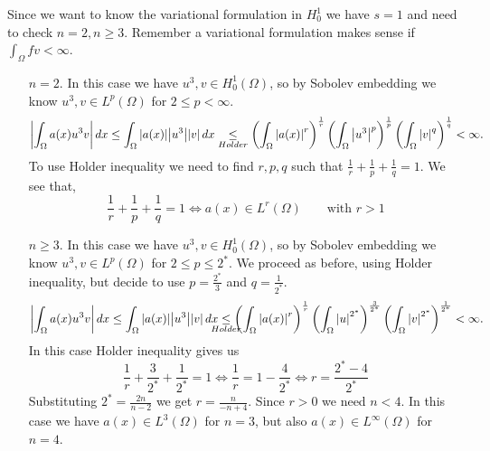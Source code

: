 Since we want to know the variational formulation in \(H^1_0\) we have \(s = 1\) and need to check \(n = 2, n \geq 3\). Remember a variational formulation makes sense if \(\int_\Omega fv < \infty\).
\begin{itemize}
    \item[\(n = 2\).] In this case we have \(u^3, v \in H^1_0(\Omega)\), so by Sobolev embedding we know \(u^3, v \in L^p(\Omega)\) for \(2 \leq p < \infty\). 
    \[
        \abs{\int_\Omega a(x) u^3 v}  \, dx \leq \int_\Omega \abs{a(x)} \abs{u^3} \abs{v} \, dx \underset{Holder}{\leq} \left(\int_\Omega \abs{a(x)}^r\right)^{\frac{1}{r}} \left(\int_\Omega \abs{u^3}^p \right)^{\frac{1}{p}} \left(\int_\Omega \abs{v}^q \right)^{\frac{1}{q}} < \infty.
    \]
    To use Holder inequality we need to find \(r, p, q\) such that \(\frac{1}{r} + \frac{1}{p} + \frac{1}{q} = 1\). We see that, 
    \[
        \frac{1}{r} + \frac{1}{p} + \frac{1}{q} = 1 \iff a(x) \in L^r(\Omega) \qquad \text{with } r > 1
    \]
    \item[\(n \geq 3\).] In this case we have \(u^3, v \in H^1_0(\Omega)\), so by Sobolev embedding we know \(u^3, v \in L^p(\Omega)\) for \(2 \leq p \leq 2^*\).
    We proceed as before, using Holder inequality, but decide to use \(p = \frac{2^*}{3}\) and \(q = \frac{1}{2^*}.\)
    \[
        \abs{\int_\Omega a(x) u^3 v}  \, dx \leq \int_\Omega \abs{a(x)} \abs{u^3} \abs{v} \, dx \underset{\mathclap{Holder}}{\leq} \left(\int_\Omega \abs{a(x)}^r\right)^{\frac{1}{r}} \left(\int_\Omega \abs{u}^{2^*} \right)^{\frac{3}{2^*}} \left(\int_\Omega \abs{v}^{2^*} \right)^{\frac{1}{2^*}} < \infty.
    \]
    In this case Holder inequality gives us 
    \[
        \frac{1}{r} + \frac{3}{2^*} + \frac{1}{2^*} = 1 \iff \frac{1}{r} = 1 - \frac{4}{2^*} \iff r = \frac{2^* - 4}{2^*}
    \]
    Substituting \(2^* = \frac{2n}{n - 2}\) we get \(r = \frac{n}{-n + 4}\). Since \(r > 0\) we need \(n < 4\).
    In this case we have \(a(x) \in L^3(\Omega)\) for \(n = 3\), but also \(a(x) \in L^\infty(\Omega)\) for \(n = 4\).
\end{itemize}

